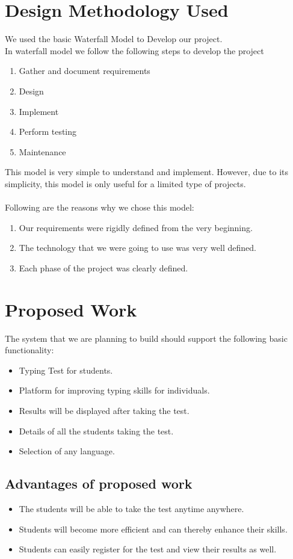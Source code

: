 \documentclass{mnnit}
\begin{document}
\chapter{Design Methodology Used}
We used the basic Waterfall Model to Develop our project.\\
In waterfall model we follow the following steps to develop the project
\begin{enumerate}
\item Gather and document requirements
\item Design
\item Implement
\item Perform testing
\item Maintenance
\end{enumerate}
This model is very simple to understand and implement. However, due to its\\
simplicity, this model is only useful for a limited type of projects.\\\\
Following are the reasons why we chose this model:
\begin{enumerate}
\item Our requirements were rigidly defined from the very beginning.
\item The technology that we were going to use was very well defined.
\item Each phase of the project was clearly defined.
\end{enumerate}


\chapter{Proposed Work}
The system that we are planning to build should support the following basic functionality:
\begin{itemize}
  \item Typing Test for students.
  \item Platform for improving typing skills for individuals.
  \item Results will be displayed after taking the test.
  \item Details of all the students taking the test.
  \item Selection of any language.
\end{itemize}

\section{Advantages of proposed work}
\begin{itemize}
    \item The students will be able to take the test anytime anywhere.
    \item Students will become more efficient and can thereby enhance their skills.
    \item Students can easily register for the test and view their results as well.\\~\\
    
\end{itemize}
\end{document}
